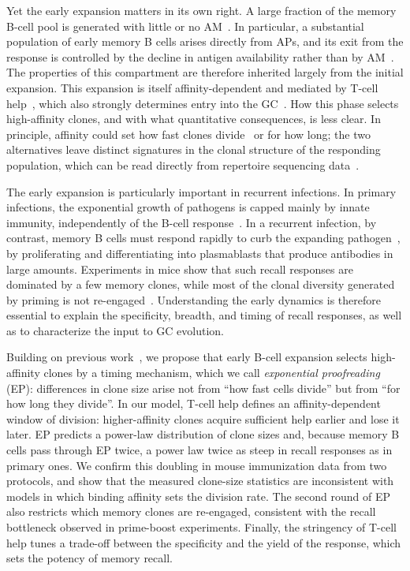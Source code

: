 \documentclass[aps, pre, twocolumn, 10pt, groupedaddress, superscriptaddress, linenumbers]{revtex4-2}
\begin{document}
Yet the early expansion matters in its own right.
A large fraction of the memory B-cell pool is generated with little or no AM~\cite{tangye_human_2007, dogan_multiple_2009, Viant_2020_Fate, Mesin_2020_Restricted_clonality, Glaros_2021_Early_memory}.
In particular, a substantial population of early memory B cells arises directly from APs, and its exit from the response is controlled by the decline in antigen availability rather than by AM~\cite{Glaros_2021_Early_memory}.
The properties of this compartment are therefore inherited largely from the initial expansion.
This expansion is itself affinity-dependent and mediated by T-cell help~\cite{Schwickert_2011_Tcells}, which also strongly determines entry into the GC~\cite{yehGerminalCenterEntry2018}.
How this phase selects high-affinity clones, and with what quantitative consequences, is less clear.
In principle, affinity could set how fast clones divide~\cite{Desponds_2021_Population} or for how long; the two alternatives leave distinct signatures in the clonal structure of the responding population, which can be read directly from repertoire sequencing data~\cite{MoranTovar_2024_Primary}.

The early expansion is particularly important in recurrent infections.
In primary infections, the exponential growth of pathogens is capped mainly by innate immunity, independently of the B-cell response~\cite{perelson_hiv-1_1996, baccam_kinetics_2006}.
In a recurrent infection, by contrast, memory B cells must respond rapidly to curb the expanding pathogen~\cite{gray_immunological_1993, palmRemembranceThingsLongTerm2019, Inoue_2024_Memory_review}, by proliferating and differentiating into plasmablasts that produce antibodies in large amounts.
Experiments in mice show that such recall responses are dominated by a few memory clones, while most of the clonal diversity generated by priming is not re-engaged~\cite{Mesin_2020_Restricted_clonality}.
Understanding the early dynamics is therefore essential to explain the specificity, breadth, and timing of recall responses, as well as to characterize the input to GC evolution.

Building on previous work~\cite{MoranTovar_2024_Primary}, we propose that early B-cell expansion selects high-affinity clones by a timing mechanism, which we call \textit{exponential proofreading} (EP): differences in clone size arise not from ``how fast cells divide'' but from ``for how long they divide''.
In our model, T-cell help defines an affinity-dependent window of division: higher-affinity clones acquire sufficient help earlier and lose it later.
EP predicts a power-law distribution of clone sizes and, because memory B cells pass through EP twice, a power law twice as steep in recall responses as in primary ones.
We confirm this doubling in mouse immunization data from two protocols, and show that the measured clone-size statistics are inconsistent with models in which binding affinity sets the division rate.
The second round of EP also restricts which memory clones are re-engaged, consistent with the recall bottleneck observed in prime-boost experiments.
Finally, the stringency of T-cell help tunes a trade-off between the specificity and the yield of the response, which sets the potency of memory recall.
\end{document}

